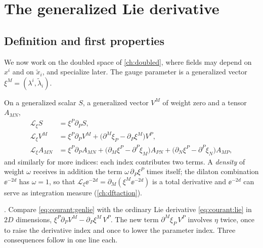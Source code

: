 \section{The generalized Lie derivative}\label{sec:courant:genlie}

\subsection{Definition and first properties}

We now work on the doubled space of \cref{ch:doubled}, where fields may depend on $x^i$ and on
$\tilde x_i$, and specialize later. The gauge parameter is a generalized vector
$\xi^M=(\lambda^i,\tilde\lambda_i)$.

\begin{definition}\label{def:courant:genlie}
%
On a generalized scalar $S$, a generalized vector $V^M$ of weight zero and a tensor $A_{MN}$,
\begin{align}
\mathcal L_\xi S&=\xi^P\partial_PS, \label{eq:courant:genlie-scalar}\\
\mathcal L_\xi V^M&=\xi^P\partial_PV^M+\bigl(\partial^M\xi_P-\partial_P\xi^M\bigr)V^P,
\label{eq:courant:genlie}\\
\mathcal L_\xi A_{MN}&=\xi^P\partial_PA_{MN}
+\bigl(\partial_M\xi^P-\partial^P\xi_M\bigr)A_{PN}+\bigl(\partial_N\xi^P-\partial^P\xi_N\bigr)A_{MP},
\label{eq:courant:genlie-tensor}
\end{align}
and similarly for more indices: each index contributes two terms. A \emph{density} of weight
$\omega$ receives in addition the term $\omega\,\partial_P\xi^P$ times itself; the dilaton
combination $\ee^{-2d}$ has $\omega=1$, so that $\mathcal L_\xi\ee^{-2d}=\partial_M(\xi^M\ee^{-2d})$
is a total derivative and $\ee^{-2d}$ can serve as integration measure (\cref{ch:dftaction}).
\end{definition}
\noindent{}. Compare \eqref{eq:courant:genlie} with the ordinary Lie derivative
\eqref{eq:courant:lie} in $2D$ dimensions, $\xi^P\partial_PV^M-\partial_P\xi^M\,V^P$. The new term
$\partial^M\xi_P\,V^P$ involves $\eta$ twice, once to raise the derivative index and once to lower
the parameter index. Three consequences follow in one line each.

